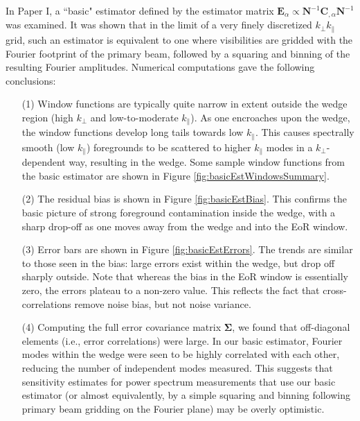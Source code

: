\documentclass[twocolumn,aps,prd,nofootinbib,showpacs]{revtex4-1}
\begin{document}
In Paper I, a ``basic" estimator defined by the estimator matrix $\mathbf{E}_\alpha \propto \mathbf{N}^{-1} \mathbf{C}_{,\alpha} \mathbf{N}^{-1}$ was examined.  It was shown that in the limit of a very finely discretized $k_\perp k_\parallel$ grid, such an estimator is equivalent to one where visibilities are gridded with the Fourier footprint of the primary beam, followed by a squaring and binning of the resulting Fourier amplitudes.  Numerical computations gave the following conclusions:
\begin{enumerate}
\item[(1)] Window functions are typically quite narrow in extent outside the wedge region (high $k_\perp$ and low-to-moderate $k_\parallel$).  As one encroaches upon the wedge, the window functions develop long tails towards low $k_\parallel$.  This causes spectrally smooth (low $k_\parallel$) foregrounds to be scattered to higher $k_\parallel$ modes in a $k_\perp$-dependent way, resulting in the wedge.  Some sample window functions from the basic estimator are shown in Figure \ref{fig:basicEstWindowsSummary}.
\item[(2)] The residual bias is shown in Figure \ref{fig:basicEstBias}.  This confirms the basic picture of strong foreground contamination inside the wedge, with a sharp drop-off as one moves away from the wedge and into the EoR window.
\item[(3)] Error bars are shown in Figure \ref{fig:basicEstErrors}.  The trends are similar to those seen in the bias: large errors exist within the wedge, but drop off sharply outside.  Note that whereas the bias in the EoR window is essentially zero, the errors plateau to a non-zero value.  This reflects the fact that cross-correlations remove noise bias, but not noise variance.
\item[(4)] Computing the full error covariance matrix $\boldsymbol \Sigma$, we found that off-diagonal elements (i.e., error correlations) were large.  In our basic estimator, Fourier modes within the wedge were seen to be highly correlated with each other, reducing the number of independent modes measured.  This suggests that sensitivity estimates for power spectrum measurements that use our basic estimator (or almost equivalently, by a simple squaring and binning following primary beam gridding on the Fourier plane) may be overly optimistic.
\end{enumerate}
\end{document}
